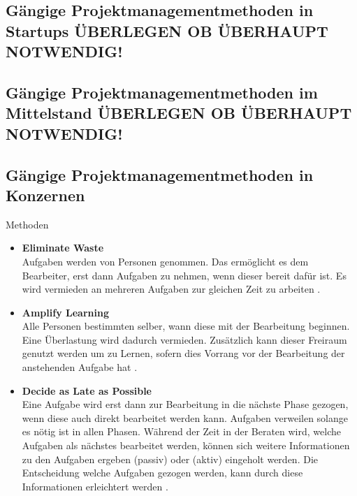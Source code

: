

\subsection{G\"angige Projektmanagementmethoden in Startups ÜBERLEGEN OB ÜBERHAUPT NOTWENDIG!} 

\subsection{G\"angige Projektmanagementmethoden im Mittelstand ÜBERLEGEN OB ÜBERHAUPT NOTWENDIG!} \label{Kap:MethodenMittelstand}

\subsection{G\"angige Projektmanagementmethoden in Konzernen} \label{Kap:MethodenKonzerne}
Methoden


	\begin{itemize}
	\item \textbf{Eliminate Waste}\\
	Aufgaben werden von Personen genommen. Das ermöglicht es dem Bearbeiter, erst dann Aufgaben zu nehmen, wenn dieser bereit dafür ist. Es wird vermieden an mehreren Aufgaben zur gleichen Zeit zu arbeiten \autocite[vgl.][S.55]{kanban}. 
	
	\item \textbf{Amplify Learning}\\
	Alle Personen bestimmten selber, wann diese mit der Bearbeitung beginnen. Eine Überlastung wird dadurch vermieden. Zusätzlich kann dieser Freiraum genutzt werden um zu Lernen, sofern dies Vorrang vor der Bearbeitung der anstehenden Aufgabe hat \autocite[vgl.][S.55]{kanban}. 
	
	\item \textbf{Decide as Late as Possible}\\
	Eine Aufgabe wird erst dann zur Bearbeitung in die nächste Phase gezogen, wenn diese auch direkt bearbeitet werden kann. Aufgaben verweilen solange es nötig ist in allen Phasen. Während der Zeit in der Beraten wird, welche Aufgaben als nächstes bearbeitet werden, können sich weitere Informationen zu den Aufgaben ergeben (passiv) oder (aktiv) eingeholt werden. Die Entscheidung welche Aufgaben gezogen werden, kann durch diese Informationen erleichtert werden \autocite[vgl.][S.55,56]{kanban}.
\end{itemize}  


